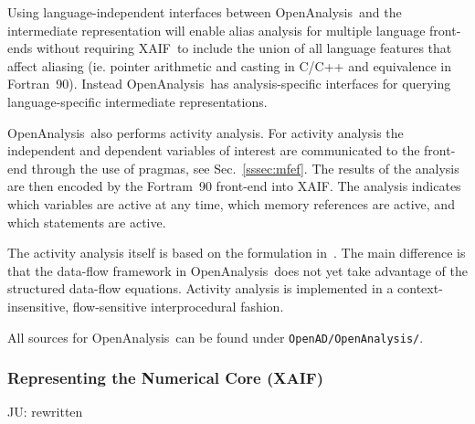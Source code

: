 \documentclass[11pt]{article}
\newcommand{\OpenAnalysis}{OpenAnalysis}
\newcommand{\xaif}{XAIF}
\newcommand{\code}[1]{{\small\tt{#1}}}
\newcommand{\refsec}[1]{{Sec.~\ref{#1}}}
\begin{document}
Using language-independent interfaces between \OpenAnalysis\ and the
intermediate representation will enable alias analysis for multiple
language front-ends without requiring \xaif\ to include the union of
all language features that affect aliasing (ie. pointer arithmetic and
casting in C/C++ and equivalence in Fortran~90).  Instead
\OpenAnalysis\ has analysis-specific interfaces for querying
language-specific intermediate representations.

\OpenAnalysis\ also performs activity analysis.  For activity analysis
the independent and dependent variables of interest are communicated
to the front-end through the use of pragmas, see \refsec{sssec:mfef}.
The results of the analysis are then encoded by the Fortram~90
front-end into \xaif.  The analysis indicates which variables are
active at any time, which memory references are active, and which
statements are active.

The activity analysis itself is based on the formulation in~\cite{HNP02}.
The main difference is that the data-flow framework in \OpenAnalysis\ does not
yet take advantage of the structured data-flow equations.  Activity analysis is
implemented in a context-insensitive, flow-sensitive interprocedural fashion.

All sources for \OpenAnalysis\ can be found under \code{OpenAD/OpenAnalysis/}.
\subsubsection{Representing the Numerical Core (\xaif)} \label{sssec:xaif}
{\color{red} JU: rewritten } 
\end{document}
